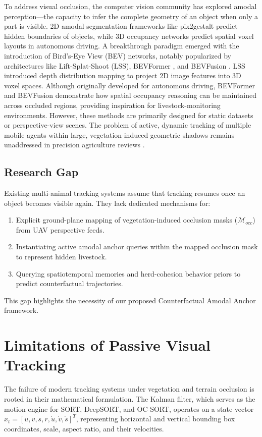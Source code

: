 \documentclass[10pt,conference,letterpaper,twocolumn]{article}
\begin{document}
To address visual occlusion, the computer vision community has explored amodal perception—the capacity to infer the complete geometry of an object when only a part is visible. 2D amodal segmentation frameworks like pix2gestalt \cite{ozguroglu2024pix2gestalt} predict hidden boundaries of objects, while 3D occupancy networks predict spatial voxel layouts in autonomous driving. A breakthrough paradigm emerged with the introduction of Bird's-Eye View (BEV) networks, notably popularized by architectures like Lift-Splat-Shoot (LSS), BEVFormer \cite{li2022bevformer}, and BEVFusion \cite{liu2023bevfusion}. LSS introduced depth distribution mapping to project 2D image features into 3D voxel spaces. Although originally developed for autonomous driving, BEVFormer \cite{li2022bevformer} and BEVFusion \cite{liu2023bevfusion} demonstrate how spatial occupancy reasoning can be maintained across occluded regions, providing inspiration for livestock-monitoring environments. However, these methods are primarily designed for static datasets or perspective-view scenes. The problem of active, dynamic tracking of multiple mobile agents within large, vegetation-induced geometric shadows remains unaddressed in precision agriculture reviews \cite{santamaria2023computer}.

\subsection{Research Gap}
Existing multi-animal tracking systems assume that tracking resumes once an object becomes visible again. They lack dedicated mechanisms for:
\begin{enumerate}
    \item Explicit ground-plane mapping of vegetation-induced occlusion masks ($\mathcal{M}_{occ}$) from UAV perspective feeds.
    \item Instantiating active amodal anchor queries within the mapped occlusion mask to represent hidden livestock.
    \item Querying spatiotemporal memories and herd-cohesion behavior priors to predict counterfactual trajectories.
\end{enumerate}
This gap highlights the necessity of our proposed Counterfactual Amodal Anchor framework.

\section{Limitations of Passive Visual Tracking}
The failure of modern tracking systems under vegetation and terrain occlusion is rooted in their mathematical formulation. The Kalman filter, which serves as the motion engine for SORT, DeepSORT, and OC-SORT, operates on a state vector $x_t = [u, v, s, r, \dot{u}, \dot{v}, \dot{s}]^T$, representing horizontal and vertical bounding box coordinates, scale, aspect ratio, and their velocities.
\end{document}
